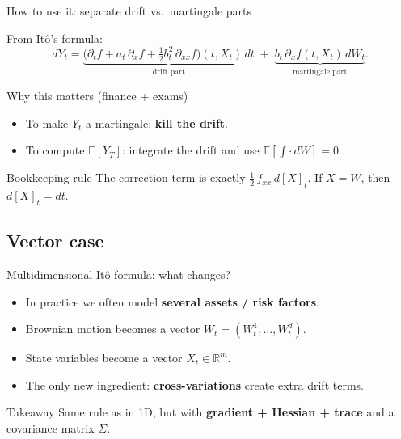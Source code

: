 \documentclass[10pt,aspectratio=169]{beamer}
\newcommand{\R}{\mathbb{R}}
\newcommand{\E}{\mathbb{E}}
\begin{document}
\begin{frame}{How to use it: separate drift vs.\ martingale parts}

From It\^o's formula:\pause
\[
dY_t = \underbrace{\Big(\partial_t f + a_t\,\partial_x f + \tfrac12 b_t^2\,\partial_{xx} f\Big)(t,X_t)\,dt}_{\text{drift part}}
\;+\;
\underbrace{b_t\,\partial_x f(t,X_t)\,dW_t}_{\text{martingale part}}.
\]\pause

\begin{block}{Why this matters (finance + exams)}
\begin{itemize}
  \item To make $Y_t$ a martingale: \textbf{kill the drift}.\pause
  \item To compute $\E[Y_T]$: integrate the drift and use $\E\!\left[\int \cdot\, dW\right]=0$.\pause
\end{itemize}
\end{block}\pause

\begin{alertblock}{Bookkeeping rule}
The correction term is exactly $\frac12\,f_{xx}\,d[X]_t$.
If $X=W$, then $d[X]_t=dt$.
\end{alertblock}

\end{frame}

\subsection{Vector case}
\begin{frame}{Multidimensional It\^o formula: what changes?}

\begin{itemize}
  \item In practice we often model \textbf{several assets / risk factors}.\pause
  \item Brownian motion becomes a vector $W_t=(W_t^1,\dots,W_t^d)$.\pause
  \item State variables become a vector $X_t\in\R^m$.\pause
  \item The only new ingredient: \textbf{cross-variations} create extra drift terms.
\end{itemize}

\medskip
\begin{alertblock}{Takeaway}
Same rule as in 1D, but with \textbf{gradient + Hessian + trace} and a covariance matrix $\Sigma$.
\end{alertblock}

\end{frame}
\end{document}
